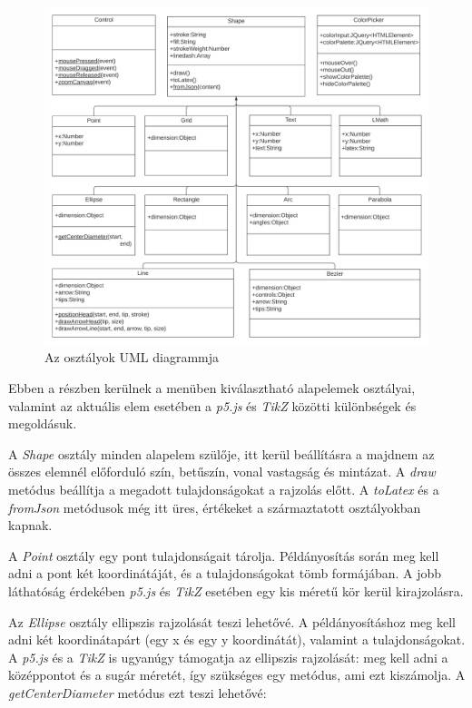 \begin{figure}[!h]
	\centering
	\includegraphics[width=\textwidth]{images/uml.png}
	\caption{Az osztályok UML diagrammja}
	\label{fig:uml}
\end{figure}


Ebben a részben kerülnek a menüben kiválasztható alapelemek osztályai, valamint az aktuális elem esetében a  \textit{p5.js} és \textit{TikZ} közötti különbségek és megoldásuk. 


A \textit{Shape} osztály minden alapelem szülője, itt kerül beállításra a majdnem az összes elemnél előforduló szín, betűszín, vonal vastagság és mintázat. A \textit{draw} metódus beállítja a megadott tulajdonságokat a rajzolás előtt. A \textit{toLatex} és a \textit{fromJson} metódusok még itt üres, értékeket a származtatott osztályokban kapnak.


A \textit{Point} osztály egy pont tulajdonságait tárolja. Példányosítás során meg kell adni a pont két koordinátáját, és a tulajdonságokat tömb formájában. A jobb láthatóság érdekében \textit{p5.js} és \textit{TikZ} esetében egy kis méretű kör kerül kirajzolásra. 


Az \textit{Ellipse} osztály ellipszis rajzolását teszi lehetővé. A példányosításhoz meg kell adni két koordinátapárt (egy x és egy y koordinátát), valamint a tulajdonságokat. A \textit{p5.js} és a \textit{TikZ} is ugyanúgy támogatja az ellipszis rajzolását: meg kell adni a középpontot és a sugár méretét, így szükséges egy metódus, ami ezt kiszámolja. A \textit{getCenterDiameter} metódus ezt teszi lehetővé:

